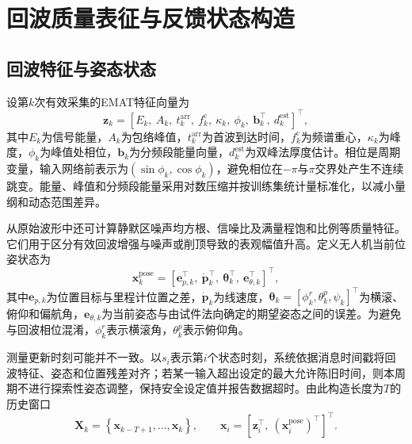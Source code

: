 \section{回波质量表征与反馈状态构造}

\subsection{回波特征与姿态状态}

设第$k$次有效采集的EMAT特征向量为
\begin{equation}
\mathbf{z}_k =
\left[
E_k,\ A_k,\ t_k^{\mathrm{arr}},\ f_k^{\mathrm{c}},\
\kappa_k,\ \phi_k,\ \mathbf{b}_k^\top,\ d_k^{\mathrm{est}}
\right]^\top ,
\label{eq:c4_echo_feature}
\end{equation}
其中$E_k$为信号能量，$A_k$为包络峰值，$t_k^{\mathrm{arr}}$为首波到达时间，$f_k^{\mathrm{c}}$为频谱重心，$\kappa_k$为峰度，$\phi_k$为峰值处相位，$\mathbf{b}_k$为分频段能量向量，$d_k^{\mathrm{est}}$为双峰法厚度估计。相位是周期变量，输入网络前表示为$(\sin\phi_k,\cos\phi_k)$，避免相位在$-\pi$与$\pi$交界处产生不连续跳变。能量、峰值和分频段能量采用对数压缩并按训练集统计量标准化，以减小量纲和动态范围差异。

从原始波形中还可计算静默区噪声均方根、信噪比及满量程饱和比例等质量特征。它们用于区分有效回波增强与噪声或削顶导致的表观幅值升高。定义无人机当前位姿状态为
\begin{equation}
\mathbf{x}^{\mathrm{pose}}_k =
\left[
\mathbf{e}_{p,k}^{\top},\
\dot{\mathbf{p}}_k^{\top},\
\boldsymbol{\theta}_k^{\top},\
\mathbf{e}_{\theta,k}^{\top}
\right]^\top ,
\label{eq:c4_pose_state}
\end{equation}
其中$\mathbf{e}_{p,k}$为位置目标与里程计位置之差，$\dot{\mathbf{p}}_k$为线速度，$\boldsymbol{\theta}_k=[\phi_k^{r},\theta_k^{p},\psi_k]^\top$为横滚、俯仰和偏航角，$\mathbf{e}_{\theta,k}$为当前姿态与由试件法向确定的期望姿态之间的误差。为避免与回波相位混淆，$\phi_k^{r}$表示横滚角，$\theta_k^{p}$表示俯仰角。

测量更新时刻可能并不一致。以$s_i$表示第$i$个状态时刻，系统依据消息时间戳将回波特征、姿态和位置残差对齐；若某一输入超出设定的最大允许陈旧时间，则本周期不进行探索性姿态调整，保持安全设定值并报告数据超时。由此构造长度为$T$的历史窗口
\begin{equation}
\mathbf{X}_k =
\left\{
\mathbf{x}_{k-T+1},\ldots,\mathbf{x}_k
\right\}, \qquad
\mathbf{x}_i =
\left[
\mathbf{z}_i^\top,\
(\mathbf{x}^{\mathrm{pose}}_i)^\top
\right]^\top .
\label{eq:c4_state_window}
\end{equation}

